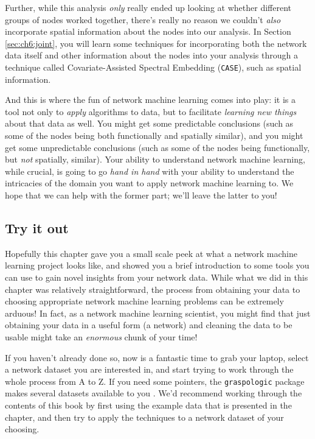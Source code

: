 Further, while this analysis \emph{only} really ended up looking at whether different groups of nodes worked together, there's really no reason we couldn't \emph{also} incorporate spatial information about the nodes into our analysis. In Section \ref{sec:ch6:joint}, you will learn some techniques for incorporating both the network data itself and other information about the nodes into your analysis through a technique called Covariate-Assisted Spectral Embedding (\texttt{CASE}), such as spatial information.

And this is where the fun of network machine learning comes into play: it is a tool not only to \emph{apply} algorithms to data, but to facilitate \emph{learning new things} about that data as well. You might get some predictable conclusions (such as some of the nodes being both functionally and spatially similar), and you might get some unpredictable conclusions (such as some of the nodes being functionally, but \emph{not} spatially, similar). Your ability to understand network machine learning, while crucial, is going to go \emph{hand in hand} with your ability to understand the intricacies of the domain you want to apply network machine learning to. We hope that we can help with the former part; we'll leave the latter to you!

\subsection{Try it out}

Hopefully this chapter gave you a small scale peek at what a network machine learning project looks like, and showed you a brief introduction to some tools you can use to gain novel insights from your network data. While what we did in this chapter was relatively straightforward, the process from obtaining your data to choosing appropriate network machine learning problems can be extremely arduous! In fact, as a network machine learning scientist, you might find that just obtaining your data in a useful form (a network) and cleaning the data to be usable might take an \emph{enormous} chunk of your time!

If you haven't already done so, now is a fantastic time to grab your laptop, select a network dataset you are interested in, and start trying to work through the whole process from A to Z. If you need some pointers, the \texttt{graspologic} package makes several datasets available to you \cite{graspydata}. We'd recommend working through the contents of this book by first using the example data that is presented in the chapter, and then try to apply the techniques to a network dataset of your choosing.